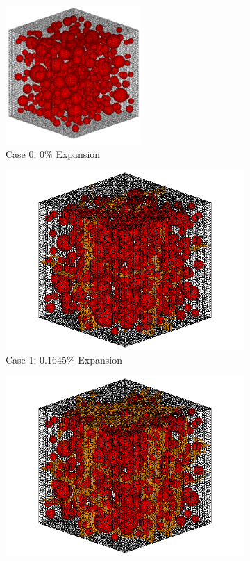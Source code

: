 \begin{figure}[!h]
\centering

    \begin{subfigure}{.5\textwidth}
      \centering
      \includegraphics[width=.6\linewidth]{Files/Aggregate/A15.png}
    \caption{Case 0: 0\% Expansion}
    \end{subfigure}%
    \begin{subfigure}{.5\textwidth}
      \centering
      \includegraphics[width=.8\linewidth]{Files/exp_3D/DEF/A15X0C_1_c.png}
    \caption{Case 1: 0.1645\% Expansion}
    \end{subfigure}
    \begin{subfigure}{.5\textwidth}
      \centering
      \includegraphics[width=.8\linewidth]{Files/exp_3D/DEF/A15X0C_2_c.png}

\end{subfigure}
\end{figure}
